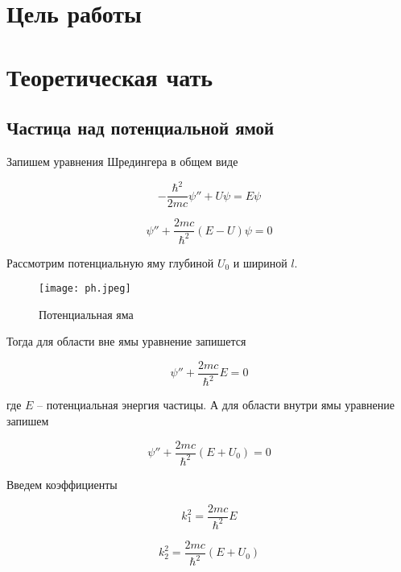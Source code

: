 


    

    \section*{Цель работы}

    \section*{Теоретическая чать}

    \subsection{Частица над потенциальной ямой}

    Запишем уравнения Шредингера в общем виде

    \begin{equation}
        -\frac{\hbar^2}{2mc} \psi'' + U \psi = E \psi
    \end{equation}

    \[ \psi'' + \frac{2mc}{\hbar^2}(E - U) \psi = 0 \]

    Рассмотрим потенциальную яму глубиной $U_0$ и шириной $l$.

    \begin{figure}
        \centering
        \texttt{[image: ph.jpeg]}
        \caption{Потенциальная яма}
        \label{fig:ph}
    \end{figure}

    Тогда для области вне ямы уравнение запишется

    \begin{equation}
        \psi'' + \frac{2mc}{\hbar^2} E = 0
    \end{equation}

    где $E$ -- потенциальная энергия частицы. А для области внутри ямы уравнение запишем

    \begin{equation}
        \psi'' + \frac{2mc}{\hbar^2}(E + U_0) = 0
    \end{equation}

    Введем коэффициенты

    \begin{equation}
        k_1^2 = \frac{2mc}{\hbar^2} E
    \end{equation}

    \begin{equation}
        k_2^2 = \frac{2mc}{\hbar^2}(E + U_0)
    \end{equation}

